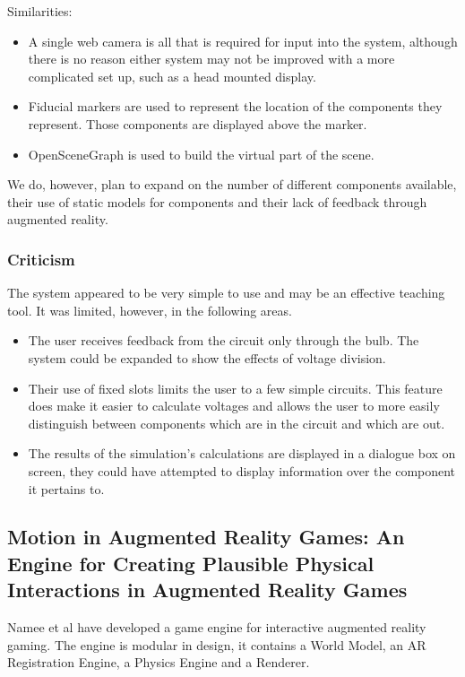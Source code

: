 Similarities:
\begin{itemize}
\item A single web camera is all that is required for input into the system, although there is no reason either system may not be improved with a more complicated set up, such as a head mounted display.
\item Fiducial markers are used to represent the location of the components they represent. Those components are displayed above the marker.
\item OpenSceneGraph is used to build the virtual part of the scene.
\end{itemize}

We do, however, plan to expand on the number of different components available, their use of static models for components and their lack of feedback through augmented reality.

\subsubsection{Criticism}
The system appeared to be very simple to use and may be an effective teaching tool. It was limited, however, in the following areas.
\begin{itemize}
\item The user receives feedback from the circuit only through the bulb. The system could be expanded to show the effects of voltage division.
\item Their use of fixed slots limits the user to a few simple circuits. This feature does make it easier to calculate voltages and allows the user to more easily distinguish between components which are in the circuit and which are out.
\item The results of the simulation's calculations are displayed in a dialogue box on screen, they could have attempted to display information over the component it pertains to.
\end{itemize}

\subsection{Motion in Augmented Reality Games: An Engine for Creating Plausible Physical Interactions in Augmented Reality Games}

Namee et al\cite{namee2010motion} have developed a game engine for interactive augmented reality gaming. The engine is modular in design, it contains a World Model, an AR Registration Engine, a Physics Engine and a Renderer.


